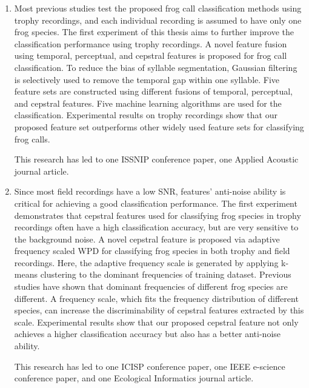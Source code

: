 \begin{enumerate}

\item Most previous studies test the proposed frog call classification methods using trophy recordings, and each individual recording is assumed to have only one frog species. The first experiment of this thesis aims to further improve the classification performance using trophy recordings. A novel feature fusion using temporal, perceptual, and cepstral features is proposed for frog call classification. To reduce the bias of syllable segmentation, Gaussian filtering is selectively used to remove the temporal gap within one syllable. Five feature sets are constructed using different fusions of temporal, perceptual, and cepstral features. Five machine learning algorithms are used for the classification. Experimental results on trophy recordings show that our proposed feature set outperforms other widely used feature sets for classifying frog calls. 

This research has led to one ISSNIP conference paper, one Applied Acoustic  journal article.

\item Since most field recordings have a low SNR, features' anti-noise ability is critical for achieving a good classification performance. The first experiment demonstrates that cepstral features used for classifying frog species in trophy recordings often have a high classification accuracy, but are very sensitive to the background noise.
A novel cepstral feature is proposed via adaptive frequency scaled WPD for classifying frog species in both trophy and field recordings. Here, the adaptive frequency scale is generated by applying k-means clustering to the dominant frequencies of training dataset. Previous studies have shown that dominant frequencies of different frog species are different. A frequency scale, which fits the frequency distribution of different species, can increase the discriminability of cepstral features extracted by this scale. Experimental results show that our proposed cepstral feature not only achieves a higher classification accuracy but also has a better anti-noise ability.

This research has led to one ICISP conference paper, one IEEE e-science conference paper, and one Ecological Informatics journal article.


\end{enumerate}
